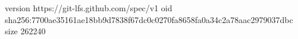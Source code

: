 version https://git-lfs.github.com/spec/v1
oid sha256:7700ae35161ae18bb9d7838f67dc0c0270fa8658fa0a34c2a78aac2979037dbc
size 262240
